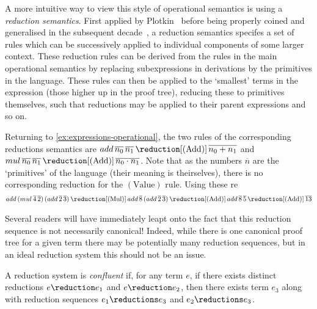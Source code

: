 A more intuitive way to view this style of operational semantics is using
a \emph{reduction semantics}.
First applied by Plotkin~\cite{plotkin1975callbyname} before being properly
coined and generalised in the subsequent
decade~\cite{felleisen1987reduction,felleisen1987calculi}, a reduction semantics
specifes a set of rules which can be successively applied to individual
components of some larger context. These reduction rules can be derived from
the rules in the main operational semantics by replacing subexpressions in
derivations by the primitives in the language.
These rules can then be applied to the `smallest' terms in the expression
(those higher up in the proof tree), reducing these to primitives themselves,
such that reductions may be applied to their parent expressions and so on.

\begin{example}\label{ex:expressions-reduction}
    Returning to \cref{ex:expressions-operational}, the two rules of the
    corresponding reductions semantics are \(
        add \, \overline{n_0} \, \overline{n_1}
        \,\reduction[(\text{Add})]\,
        \overline{n_0 + n_1}
    \) and \(
        mul \, \overline{n_0} \, \overline{n_1}
        \,\reduction[(\text{Add})]\,
        \overline{n_0 \cdot n_1}
    \).
    Note that as the numbers \(\overline{n}\) are the `primitives' of the
    language (their meaning is theirselves), there is no corresponding reduction
    for the \((\text{Value})\) rule.
    Using these re
    \begin{gather*}
        add \, (mul \, \overline{4} \, \overline{2}) \, (add \, \overline{2} \, \overline{3})
        \,\reduction[(\text{Mul})]\,
        add \, \overline{8} \, (add \, \overline{2} \, \overline{3})
        \,\reduction[(\text{Add})]\,
        add \, \overline{8} \, \overline{5}
        \,\reduction[(\text{Add})]\,
        \overline{13}
    \end{gather*}
\end{example}

Several readers will have immediately leapt onto the fact that this reduction
sequence is not necessarily canonical!
Indeed, while there is one canonical proof tree for a given term there may be
potentially many reduction sequences, but in an ideal reduction system this
should not be an issue.

\begin{definition}
    A reduction system is \emph{confluent} if, for any term \(e\), if there
    exists distinct reductions \(e \reduction e_1\) and \(e \reduction e_2\),
    then there exists term \(e_3\) along with reduction sequences
    \(e_1 \reductions e_3\) and \(e_2 \reductions e_3\).
\end{definition}

